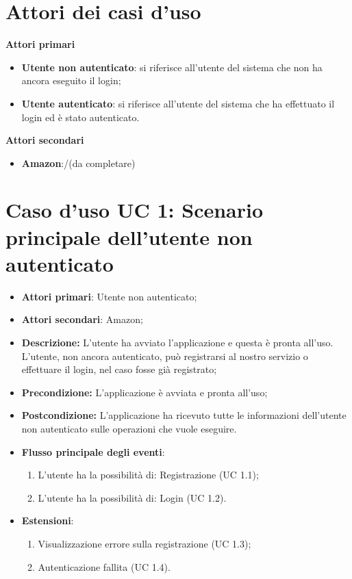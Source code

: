 \section{Attori dei casi d'uso}
\textbf{Attori primari}
	\begin{itemize}
	\item \textbf{Utente non autenticato}: si riferisce all'utente del sistema che non ha ancora eseguito il login;
	\item \textbf{Utente autenticato}: si riferisce all'utente del sistema che ha effettuato il login ed è stato autenticato.
	\end{itemize}
\textbf{Attori secondari}
	\begin{itemize}
	\item \textbf{Amazon}:/(da completare)
\end{itemize}





\section{Caso d'uso UC 1: Scenario principale dell'utente non autenticato}
\begin{itemize}
	\item \textbf{Attori primari}: Utente non autenticato;
	\item \textbf{Attori secondari}: Amazon;
	\item \textbf{Descrizione:} L'utente ha avviato l'applicazione e questa è pronta all'uso. L'utente, non ancora autenticato, può registrarsi al nostro servizio o effettuare il login, nel caso fosse già registrato;
	\item \textbf{Precondizione:} L'applicazione è avviata e pronta all'uso;
	\item \textbf{Postcondizione:} L'applicazione ha ricevuto tutte le informazioni dell'utente non autenticato sulle operazioni che vuole eseguire.
	\item \textbf{Flusso principale degli eventi}:
		\begin{enumerate}
			\item L'utente ha la possibilità di: Registrazione (UC 1.1);
			\item L'utente ha la possibilità di: Login (UC 1.2).
		\end{enumerate}
	\item \textbf{Estensioni}:
		\begin{enumerate}
			\item Visualizzazione errore sulla registrazione (UC 1.3);
			\item Autenticazione fallita (UC 1.4).
		\end{enumerate}
\end{itemize}
